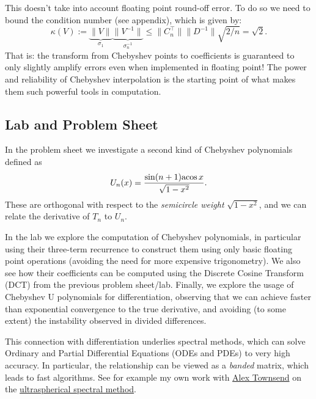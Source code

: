 This doesn't take into account floating point round-off error. To do so we need to bound the condition number (see appendix), which is given by:
\[
\ensuremath{\kappa}(V) := \underbrace{\| V \|}_{\ensuremath{\sigma}_1} \underbrace{\|V^{-1}\|}_{\ensuremath{\sigma}_n^{-1}} \ensuremath{\leq} \| C_n^\ensuremath{\top} \| \| D^{-1}\| \sqrt{2/n} = \sqrt{2}.
\]
That is: the transform from Chebyshev points to coefficients is guaranteed to only slightly amplify errors even when implemented in floating point! The power and reliability of Chebyshev interpolation is the starting point of what makes them such powerful tools in computation.

\subsection{Lab and Problem Sheet}
In the problem sheet we investigate a second kind of Chebyshev polynomials defined as
\[
U_n(x) = {\sin (n+1) {\rm acos}\, x \over \sqrt{1-x^2}}.
\]
These are orthogonal with respect to the \emph{semicircle weight} $\sqrt{1-x^2}$, and we can relate the derivative of $T_n$ to $U_n$.

In the lab we explore the computation of Chebyshev polynomials, in particular using their three-term recurrence to construct them using only basic floating point operations (avoiding the need for more expensive trigonometry). We also see how their coefficients can be computed using the Discrete Cosine Transform (DCT) from the previous problem sheet/lab. Finally, we explore the usage of Chebyshev U polynomials for differentiation, observing that we can achieve faster than exponential convergence to the true derivative, and avoiding (to some extent) the instability observed in divided differences.

This connection with differentiation underlies spectral methods, which can solve Ordinary and Partial Differential Equations (ODEs and PDEs) to very high accuracy. In particular, the relationship can be viewed as a \emph{banded} matrix, which leads to fast algorithms.  See for example my own work with \href{https://pi.math.cornell.edu/~ajt/}{Alex Townsend} on the \href{https://epubs.siam.org/doi/10.1137/120865458}{ultraspherical spectral method}.



